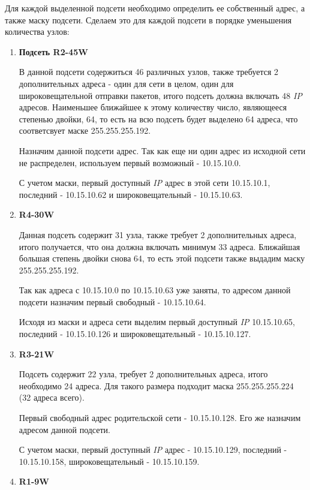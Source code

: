 \documentclass[a4paper]{article}
\begin{document}
  Для каждой выделенной подсети необходимо определить ее собственный адрес, а также
  маску подсети. Сделаем это для каждой подсети в порядке уменьшения количества узлов:
  \begin{enumerate}
    \item {
      \textbf{Подсеть R2-45W}

      В данной подсети содержиться 46 различных узлов, также требуется 2 дополнительных
      адреса - один для сети в целом, один для широковещательной отправки пакетов,
      итого подсеть должна включать 48 \textit{IP} адресов. Наименьшее ближайшее к этому
      количеству число, являющееся степенью двойки, 64, то есть на всю подсеть будет
      выделено 64 адреса, что соответсвует маске 255.255.255.192.

      Назначим данной подсети адрес. Так как еще ни один адрес из исходной сети не
      распределен, используем первый возможный - 10.15.10.0.

      С учетом маски, первый доступный \textit{IP} адрес в этой сети 10.15.10.1,
      последний - 10.15.10.62 и широковещательный - 10.15.10.63.
    }
    \item {
      \textbf{R4-30W}

      Данная подсеть содержит 31 узла, также требует 2 дополнительных адреса,
      итого получается, что она должна включать минимум 33 адреса. Ближайшая
      большая степень двойки снова 64, то есть этой подсети также выдадим маску
      255.255.255.192.

      Так как адреса с 10.15.10.0 по 10.15.10.63 уже заняты, то адресом
      данной подсети назначим первый свободный - 10.15.10.64.

      Исходя из маски и адреса сети выделим первый доступный \textit{IP}
      10.15.10.65, последний - 10.15.10.126 и широковещательный - 10.15.10.127.
    }
    \item {
      \textbf{R3-21W}

      Подсеть содержит 22 узла, требует 2 дополнительных адреса, итого необходимо 24 адреса.
      Для такого размера подходит маска 255.255.255.224 (32 адреса всего).

      Первый свободный адрес родительской сети - 10.15.10.128. Его же назначим адресом
      данной подсети.

      С учетом маски, первый доступный \textit{IP} адрес - 10.15.10.129, последний - 10.15.10.158,
      широковещательный - 10.15.10.159.
    }
    \item {
      \textbf{R1-9W}

}
\end{enumerate}
\end{document}
